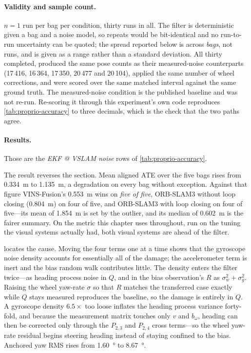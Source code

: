 \paragraph{Validity and sample count.}
$n=1$ run per bag per condition, thirty runs in all. The filter is deterministic
given a bag and a noise model, so repeats would be bit-identical and no
run-to-run uncertainty can be quoted; the spread reported below is across
\emph{bags}, not runs, and is given as a range rather than a standard deviation.
All thirty completed, produced the same pose counts as their measured-noise
counterparts (17\,416, 16\,364, 17\,350, 20\,477 and 20\,104), applied the same
number of wheel corrections, and were scored over the same matched interval
against the same ground truth. The measured-noise condition is the published
baseline and was not re-run. Re-scoring it through this experiment's own code
reproduces \cref{tab:proprio-accuracy} to three decimals, which is the check that
the two paths agree.

\paragraph{Results.}
Those are the \emph{EKF @ VSLAM noise} rows of \cref{tab:proprio-accuracy}.

The result reverses the section. Mean aligned ATE over the five bags rises from
\SI{0.334}{\metre} to \SI{1.135}{\metre}, a degradation on every bag without
exception. Against that figure VINS-Fusion's \SI{0.553}{\metre} wins on
\emph{five of five}, ORB-SLAM3 without loop closing (\SI{0.804}{\metre}) on four
of five, and ORB-SLAM3 with loop closing on four of five---its mean of
\SI{1.854}{\metre} is set by the  outlier, and its median of
\SI{0.602}{\metre} is the fairer summary. On the metric this chapter uses
throughout, run on the tuning the visual systems actually had, both visual systems
are ahead of the filter.

 locates the cause. Moving the four terms one at
a time shows that the gyroscope noise density accounts for essentially all of the
damage; the accelerometer term is inert and the bias random walk contributes
little. The density enters the filter twice---as heading process noise in $Q$, and
in the bias observation's $R$ as $\sigma_{w}^{2} + \sigma_{g}^{2}$. Raising the
wheel yaw-rate $\sigma$ so that $R$ matches the transferred case exactly while $Q$
stays measured reproduces the baseline, so the damage is entirely in $Q$. A
gyroscope density $6.5\times$ too loose inflates the heading process variance
forty-fold, and because the measurement matrix touches only $v$ and $b_{\omega}$,
heading can then be corrected only through the $P_{2,3}$ and $P_{2,4}$ cross
terms---so the wheel yaw-rate residual begins steering heading instead of staying
confined to the bias. Anchored yaw RMS rises from \SI{1.60}{\degree} to
\SI{8.67}{\degree}.

